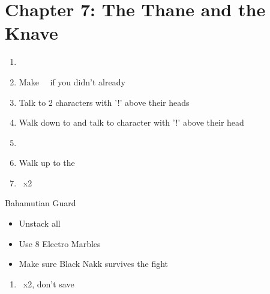 \chapter{Chapter 7: The Thane and the Knave}
\begin{enumerate}
	\item \cs\
	\item Make \lann\ \smallc\ if you didn't already
	\item Talk to 2 characters with '!' above their heads
	\item Walk down to  and talk to character with '!' above their head
	\item \cs\
	\item Walk up to the \location{Castle}
	\item \cs\ x2
\end{enumerate}
\begin{battle}[]{Bahamutian Guard}
	\begin{itemize}
		\item Unstack all
		\item Use 8 Electro Marbles
		\item Make sure Black Nakk survives the fight
	\end{itemize}
\end{battle}
\begin{enumerate}[resume]
	\item \cs\ x2, don't save
\end{enumerate}